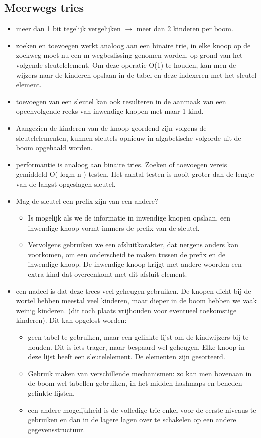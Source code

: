 \subsection{Meerwegs tries}
\begin{itemize}
\item meer dan 1 bit tegelijk vergelijken $\rightarrow$ meer dan 2 kinderen per boom.
\item zoeken en toevoegen werkt analoog aan een binaire trie, in elke knoop op de zoekweg moet nu een m-wegbeslissing genomen worden, op grond van het volgende sleutelelement. Om deze operatie O(1) te houden, kan men de wijzers naar de kinderen opslaan in de tabel en deze indexeren met het sleutel element.
\item toevoegen van een sleutel kan ook resulteren in de aanmaak van een opeenvolgende reeks van inwendige knopen met maar 1 kind.
\item Aangezien de kinderen van de knoop geordend zijn volgens de sleutelelementen, kunnen sleutels opnieuw in algabetische volgorde uit de boom opgehaald worden.
\item performantie is analoog aan binaire tries. Zoeken of toevoegen vereis gemiddeld O( logm n ) testen. Het aantal testen is nooit groter dan de lengte van de langst opgeslagen sleutel.
\item Mag de sleutel een prefix zijn van een andere? 
\begin{itemize}
\item Is mogelijk als we de informatie in inwendige knopen opslaan, een inwendige knoop vormt immers de prefix van de sleutel.
\item Vervolgens gebruiken we een afsluitkarakter, dat nergens anders kan voorkomen, om een onderscheid te maken tussen de prefix en de inwendige knoop. De inwendige knoop krijgt met andere woorden een extra kind dat overeenkomt met dit afsluit element.
\end{itemize}
\clearpage
\item een nadeel is dat deze trees veel geheugen gebruiken. De knopen dicht bij de wortel hebben meestal veel kinderen, maar dieper in de boom hebben we vaak weinig kinderen. (dit toch plaats vrijhouden voor eventueel toekomstige kinderen). Dit kan opgelost worden:
\begin{itemize}
\item geen tabel te gebruiken, maar een gelinkte lijst om de kindwijzers bij te houden. Dit is iets trager, maar bespaard wel geheugen. Elke knoop in deze lijst heeft een sleutelelement. De elementen zijn gesorteerd.
\item Gebruik maken van verschillende mechanismen: zo kan men bovenaan in de boom wel tabellen gebruiken, in het midden hashmaps en beneden gelinkte lijsten.
\item een andere mogelijkheid is de volledige trie enkel voor de eerste niveaus te gebruiken en dan in de lagere lagen over te schakelen op een andere gegevensstructuur.
\end{itemize}
\end{itemize}

